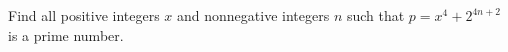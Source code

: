 Find all positive integers $x$ and nonnegative integers $n$ such that $p=x^4+2^{4n+2}$ is a prime number.
